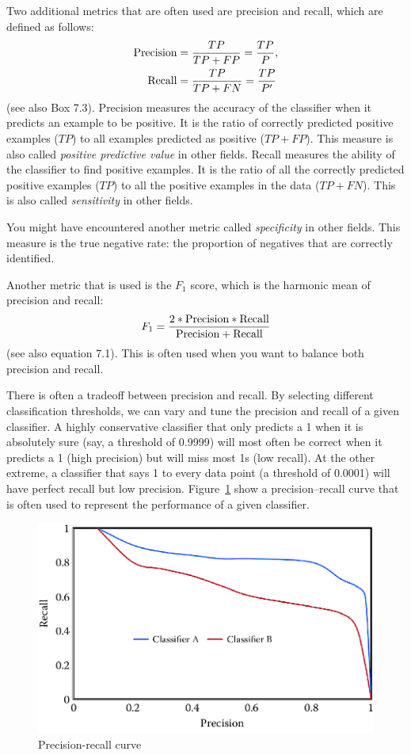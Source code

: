 \documentclass[]{krantz}
\begin{document}
Two additional metrics that are often used are precision and recall,
which are defined as follows: \[\begin{aligned}
{\rm Precision} &= \frac{TP}{TP + FP}=\frac{TP}{P},
\\
{\rm Recall} &= \frac{TP}{TP + FN}=\frac{TP}{P'}\end{aligned}\] (see
also Box 7.3). Precision measures the accuracy of the classifier when it
predicts an example to be positive. It is the ratio of correctly
predicted positive examples (\(TP\)) to all examples predicted as
positive (\(TP + FP\)). This measure is also called \emph{positive
predictive value} in other fields. Recall measures the ability of the
classifier to find positive examples. It is the ratio of all the
correctly predicted positive examples (\(TP\)) to all the positive
examples in the data (\(TP + FN\)). This is also called
\emph{sensitivity} in other fields.

You might have encountered another metric called \emph{specificity} in
other fields. This measure is the true negative rate: the proportion of
negatives that are correctly identified.

Another metric that is used is the \(F_1\) score, which is the harmonic
mean of precision and recall:
\[F_1 =  \frac{2* {\rm Precision} * {\rm Recall}}{{\rm Precision} + {\rm Recall}}\]
(see also equation 7.1). This is often used when you want to balance
both precision and recall.

There is often a tradeoff between precision and recall. By selecting
different classification thresholds, we can vary and tune the precision
and recall of a given classifier. A highly conservative classifier that
only predicts a 1 when it is absolutely sure (say, a threshold of
0.9999) will most often be correct when it predicts a 1 (high precision)
but will miss most 1s (low recall). At the other extreme, a classifier
that says 1 to every data point (a threshold of 0.0001) will have
perfect recall but low precision. Figure~\ref{fig:pr} show a
precision--recall curve that is often used to represent the performance
of a given classifier.

\begin{figure}

{\centering \includegraphics[width=0.7\linewidth]{ChapterML/figures/pr} 

}

\caption{Precision-recall curve}\label{fig:pr}
\end{figure}
\end{document}
